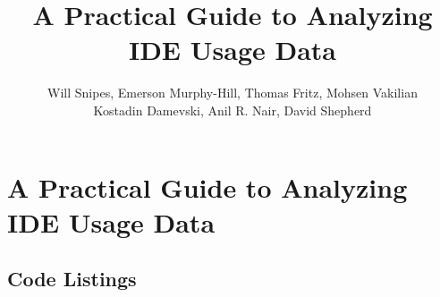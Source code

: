 \documentclass{book}
\begin{document}
\title{A Practical Guide to Analyzing IDE Usage Data\vspace{-0ex}}

\chapter{A Practical Guide to Analyzing IDE Usage Data\vspace{-0ex}}
\author{
Will Snipes, Emerson Murphy-Hill,
Thomas Fritz, Mohsen Vakilian \\
Kostadin Damevski,
Anil R. Nair, David Shepherd
}
\maketitle
\thispagestyle{empty}
\pagestyle{empty}



\pagebreak



\pagebreak

\section{Code Listings}



 
\end{document}
